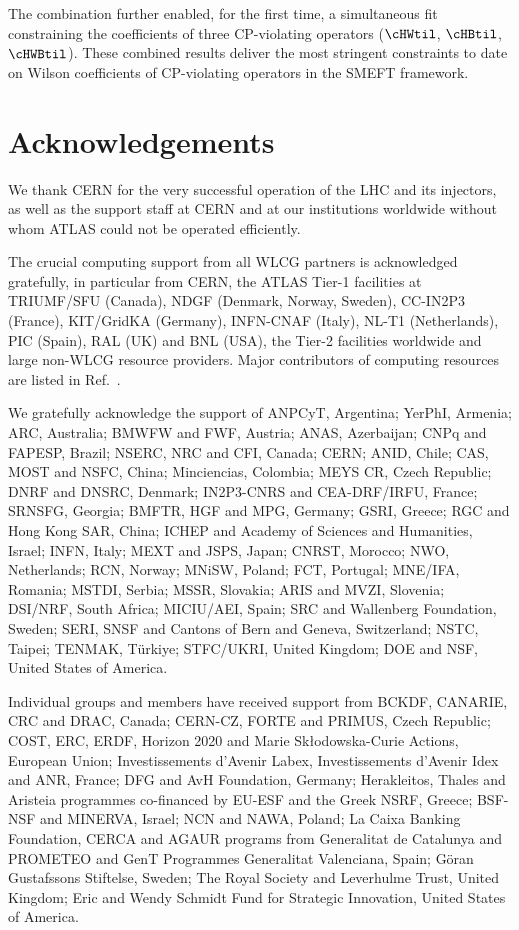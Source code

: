 \documentclass[PAPER, atlasdraft=false, cernpreprint,UKenglish, texmf, orcidlogo]{atlasdoc}
\begin{document}
The combination further enabled, for the first time, a simultaneous fit constraining the coefficients of three CP-violating operators ($\cHWtil$, $\cHBtil$, $\cHWBtil$).
These combined results deliver the most stringent constraints to date on Wilson coefficients of CP-violating operators in the SMEFT framework.



\clearpage
\section*{Acknowledgements}










We thank CERN for the very successful operation of the LHC and its injectors, as well as the support staff at
CERN and at our institutions worldwide without whom ATLAS could not be operated efficiently.

The crucial computing support from all WLCG partners is acknowledged gratefully, in particular from CERN, the ATLAS Tier-1 facilities at TRIUMF/SFU (Canada), NDGF (Denmark, Norway, Sweden), CC-IN2P3 (France), KIT/GridKA (Germany), INFN-CNAF (Italy), NL-T1 (Netherlands), PIC (Spain), RAL (UK) and BNL (USA), the Tier-2 facilities worldwide and large non-WLCG resource providers. Major contributors of computing resources are listed in Ref.~\cite{ATL-SOFT-PUB-2026-001}.

We gratefully acknowledge the support of ANPCyT, Argentina; YerPhI, Armenia; ARC, Australia; BMWFW and FWF, Austria; ANAS, Azerbaijan; CNPq and FAPESP, Brazil; NSERC, NRC and CFI, Canada; CERN; ANID, Chile; CAS, MOST and NSFC, China; Minciencias, Colombia; MEYS CR, Czech Republic; DNRF and DNSRC, Denmark; IN2P3-CNRS and CEA-DRF/IRFU, France; SRNSFG, Georgia; BMFTR, HGF and MPG, Germany; GSRI, Greece; RGC and Hong Kong SAR, China; ICHEP and Academy of Sciences and Humanities, Israel; INFN, Italy; MEXT and JSPS, Japan; CNRST, Morocco; NWO, Netherlands; RCN, Norway; MNiSW, Poland; FCT, Portugal; MNE/IFA, Romania; MSTDI, Serbia; MSSR, Slovakia; ARIS and MVZI, Slovenia; DSI/NRF, South Africa; MICIU/AEI, Spain; SRC and Wallenberg Foundation, Sweden; SERI, SNSF and Cantons of Bern and Geneva, Switzerland; NSTC, Taipei; TENMAK, T\"urkiye; STFC/UKRI, United Kingdom; DOE and NSF, United States of America.

Individual groups and members have received support from BCKDF, CANARIE, CRC and DRAC, Canada; CERN-CZ, FORTE and PRIMUS, Czech Republic; COST, ERC, ERDF, Horizon 2020 and Marie Sk{\l}odowska-Curie Actions, European Union; Investissements d'Avenir Labex, Investissements d'Avenir Idex and ANR, France; DFG and AvH Foundation, Germany; Herakleitos, Thales and Aristeia programmes co-financed by EU-ESF and the Greek NSRF, Greece; BSF-NSF and MINERVA, Israel; NCN and NAWA, Poland; La Caixa Banking Foundation, CERCA and AGAUR programs from Generalitat de Catalunya and PROMETEO and GenT Programmes Generalitat Valenciana, Spain; G\"{o}ran Gustafssons Stiftelse, Sweden; The Royal Society and Leverhulme Trust, United Kingdom; Eric and Wendy Schmidt Fund for Strategic Innovation, United States of America.
\end{document}
